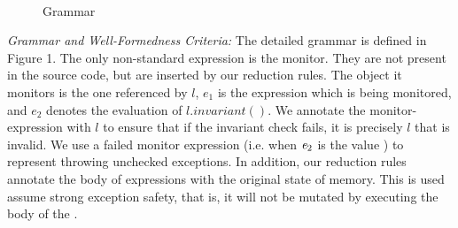 \begin{figure}
\begin{grammatica}
\\
\\
\\
\\
\\
\\
\end{grammatica}
\caption{Grammar 
}
\end{figure}


\loseSpace
\noindent\textit{Grammar and Well-Formedness Criteria:}
The detailed grammar is defined in Figure 1.
The only non-standard expression is the monitor. They are not present in the source code, but are inserted by our reduction rules. The object it monitors is the one referenced by $l$, $e_1$ is the expression which is being monitored, and $e_2$ denotes the evaluation of $l.invariant()$.
We annotate the monitor-expression with $l$ to ensure
that if the invariant check fails, it is precisely $l$ that is invalid.
We use a failed monitor expression (i.e. when ${\mathit{e}}_2$ is the value \Q@false@) to represent throwing unchecked exceptions.
In addition, our reduction rules annotate the body of \Q@try@ expressions with
the original state of memory. This is used assume strong exception safety, that is, it will not be mutated by executing the body of the \Q@try@.


